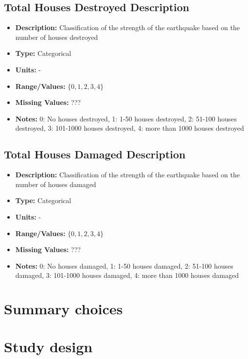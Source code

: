 \documentclass{article}
\begin{document}
\subsection{Total Houses Destroyed Description}
\begin{itemize}
    \item \textbf{Description:} Classification of the strength of the earthquake based on the number of houses destroyed
    \item \textbf{Type:} Categorical
    \item \textbf{Units:} -
    \item \textbf{Range/Values:} $\{0,1,2,3,4 \}$
    \item \textbf{Missing Values:} ???
    \item \textbf{Notes:} 0: No houses destroyed, 1: 1-50 houses destroyed, 2: 51-100 houses destroyed, 3: 101-1000 houses destroyed, 4: more than 1000 houses destroyed
\end{itemize}

\subsection{Total Houses Damaged Description}
\begin{itemize}
    \item \textbf{Description:} Classification of the strength of the earthquake based on the number of houses damaged
    \item \textbf{Type:} Categorical
    \item \textbf{Units:} -
    \item \textbf{Range/Values:} $\{0,1,2,3,4 \}$
    \item \textbf{Missing Values:} ???
    \item \textbf{Notes:} 0: No houses damaged, 1: 1-50 houses damaged, 2: 51-100 houses damaged, 3: 101-1000 houses damaged, 4: more than 1000 houses damaged
\end{itemize}

\section{Summary choices}

\section{Study design}
\end{document}
